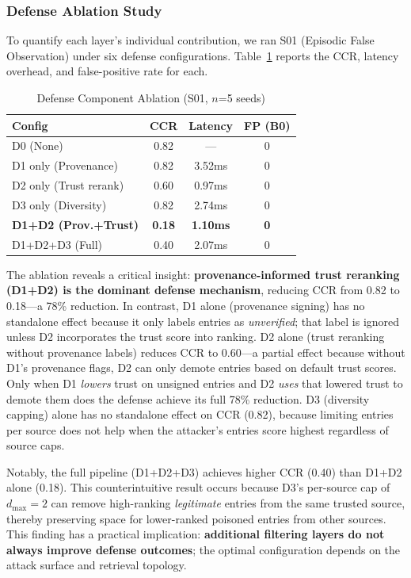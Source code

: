 \documentclass[conference]{IEEEtran}
\begin{document}
\subsubsection{Defense Ablation Study}

To quantify each layer's individual contribution, we ran S01 (Episodic False Observation) under six defense configurations. Table~\ref{tab:ablation} reports the CCR, latency overhead, and false-positive rate for each.

\begin{table}[t]
\caption{Defense Component Ablation (S01, $n$=5 seeds)}
\label{tab:ablation}
\centering
\footnotesize
\begin{tabular}{lccc}
\toprule
\textbf{Config} & \textbf{CCR} & \textbf{Latency} & \textbf{FP (B0)} \\
\midrule
D0 (None) & 0.82 & --- & 0 \\
D1 only (Provenance) & 0.82 & 3.52ms & 0 \\
D2 only (Trust rerank) & 0.60 & 0.97ms & 0 \\
D3 only (Diversity) & 0.82 & 2.74ms & 0 \\
\textbf{D1+D2 (Prov.+Trust)} & \textbf{0.18} & \textbf{1.10ms} & \textbf{0} \\
D1+D2+D3 (Full) & 0.40 & 2.07ms & 0 \\
\bottomrule
\end{tabular}
\end{table}

The ablation reveals a critical insight: \textbf{provenance-informed trust reranking (D1+D2) is the dominant defense mechanism}, reducing CCR from 0.82 to 0.18---a 78\% reduction. In contrast, D1 alone (provenance signing) has no standalone effect because it only labels entries as \textit{unverified}; that label is ignored unless D2 incorporates the trust score into ranking. D2 alone (trust reranking without provenance labels) reduces CCR to 0.60---a partial effect because without D1's provenance flags, D2 can only demote entries based on default trust scores. Only when D1 \textit{lowers} trust on unsigned entries and D2 \textit{uses} that lowered trust to demote them does the defense achieve its full 78\% reduction. D3 (diversity capping) alone has no standalone effect on CCR (0.82), because limiting entries per source does not help when the attacker's entries score highest regardless of source caps.

Notably, the full pipeline (D1+D2+D3) achieves higher CCR (0.40) than D1+D2 alone (0.18). This counterintuitive result occurs because D3's per-source cap of $d_{\max}=2$ can remove high-ranking \textit{legitimate} entries from the same trusted source, thereby preserving space for lower-ranked poisoned entries from other sources. This finding has a practical implication: \textbf{additional filtering layers do not always improve defense outcomes}; the optimal configuration depends on the attack surface and retrieval topology.
\end{document}
